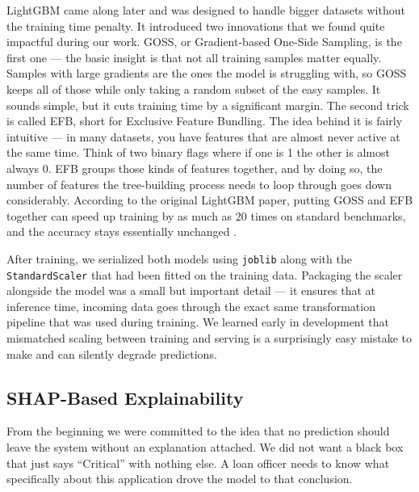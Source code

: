 LightGBM came along later and was designed to handle bigger datasets without the training time penalty. It introduced two innovations that we found quite impactful during our work. GOSS, or Gradient-based One-Side Sampling, is the first one --- the basic insight is that not all training samples matter equally. Samples with large gradients are the ones the model is struggling with, so GOSS keeps all of those while only taking a random subset of the easy samples. It sounds simple, but it cuts training time by a significant margin. The second trick is called EFB, short for Exclusive Feature Bundling. The idea behind it is fairly intuitive --- in many datasets, you have features that are almost never active at the same time. Think of two binary flags where if one is 1 the other is almost always 0. EFB groups those kinds of features together, and by doing so, the number of features the tree-building process needs to loop through goes down considerably. According to the original LightGBM paper, putting GOSS and EFB together can speed up training by as much as 20 times on standard benchmarks, and the accuracy stays essentially unchanged \cite{11}.

After training, we serialized both models using \texttt{joblib} along with the \texttt{StandardScaler} that had been fitted on the training data. Packaging the scaler alongside the model was a small but important detail --- it ensures that at inference time, incoming data goes through the exact same transformation pipeline that was used during training. We learned early in development that mismatched scaling between training and serving is a surprisingly easy mistake to make and can silently degrade predictions.

\subsection{SHAP-Based Explainability}

From the beginning we were committed to the idea that no prediction should leave the system without an explanation attached. We did not want a black box that just says ``Critical'' with nothing else. A loan officer needs to know what specifically about this application drove the model to that conclusion.

